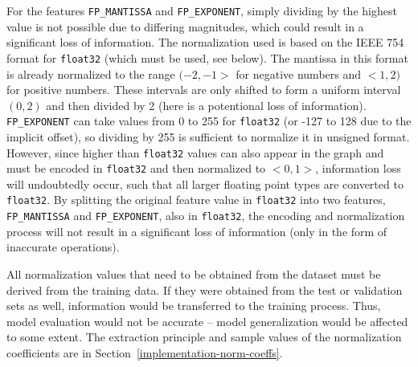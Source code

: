 For the features \texttt{FP\_MANTISSA} and \texttt{FP\_EXPONENT}, simply dividing by the highest value is not possible due to differing magnitudes, which could result in a significant loss of information. The normalization used is based on the IEEE 754~\cite{ieee-floating-point} format for \texttt{float32} (which must be used, see below). The mantissa in this format is already normalized to the range $(-2, -1>$ for negative numbers and $<1, 2)$ for positive numbers. These intervals are only shifted to form a uniform interval $(0, 2)$ and then divided by 2 (here is a potentional loss of information). \texttt{FP\_EXPONENT} can take values from 0 to 255 for \texttt{float32} (or -127 to 128 due to the implicit offset), so dividing by 255 is sufficient to normalize it in unsigned format. However, since higher than \texttt{float32} values can also appear in the graph and must be encoded in \texttt{float32} and then normalized to $<0,1>$, information loss will undoubtedly occur, such that all larger floating point types are converted to \texttt{float32}. By splitting the original feature value in \texttt{float32} into two features, \texttt{FP\_MANTISSA} and \texttt{FP\_EXPONENT}, also in \texttt{float32}, the encoding and normalization process will not result in a significant loss of information (only in the form of inaccurate operations).

All normalization values that need to be obtained from the dataset must be derived from the training data. If they were obtained from the test or validation sets as well, information would be transferred to the training process. Thus, model evaluation would not be accurate -- model generalization would be affected to some extent. The extraction principle and sample values of the normalization coefficients are in Section~\ref{implementation-norm-coeffs}.


